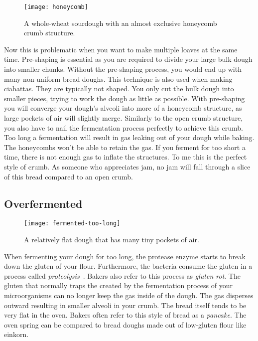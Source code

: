 \begin{figure}
  \texttt{[image: honeycomb]}
  \caption[Honeycomb crumb structure]{A whole-wheat sourdough with an almost
      exclusive honeycomb crumb structure.}%
  \label{fig:honeycomb}
\end{figure}


Now this is problematic when you want to
make multiple loaves at the same time. Pre-shaping is essential as you are required
to divide your large bulk dough into smaller chunks. Without the pre-shaping
process, you would end up with many non-uniform bread doughs. This technique is
also used when making ciabattas. They are typically not shaped. You only cut the
bulk dough into smaller pieces, trying to work the dough as little as possible.
With pre-shaping you will converge your dough's alveoli into more of a honeycomb structure,
as large pockets of air will slightly merge. Similarly to the open crumb structure,
you also have to nail the fermentation process perfectly to achieve this crumb.
Too long a fermentation will result in gas leaking out of your dough while baking.
The honeycombs won't be able to retain the gas. If you ferment for too short a time,
there is not enough gas to inflate the structures. To me this is the perfect
style of crumb. As someone who appreciates jam, no jam will fall through a slice
of this bread compared to an open crumb.

\subsection{Overfermented}%
\label{subsec:overfermented-dough}

\begin{figure}
  \texttt{[image: fermented-too-long]}
  \caption[Overfermented sourdough bread]{A relatively flat dough that has many tiny pockets of air.}%
  \label{fig:fermented-too-long}
\end{figure}

When fermenting your dough for too long, the protease enzyme starts to
break down the gluten of your flour. Furthermore, the bacteria consume the gluten
in a process called \emph{proteolysis}~\cite{raffaella+di+cagno}.
Bakers also refer to this process as \emph{gluten rot}.
The gluten that normally traps the  created
by the fermentation process of your microorganisms can no longer keep the
gas inside of the dough. The gas disperses outward resulting in smaller alveoli in your crumb.
The bread itself tends to be very flat in the oven. Bakers often refer
to this style of bread as a \emph{pancake}. The oven spring can be compared
to bread doughs made out of low-gluten flour like einkorn.

